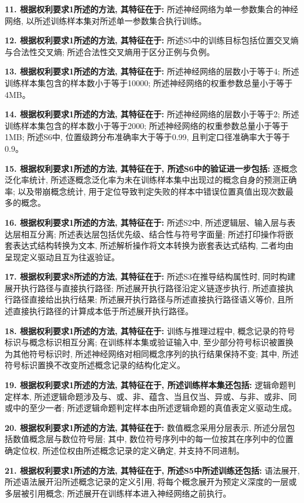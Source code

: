 \documentclass[
]{article}
\begin{document}
\textbf{11. 根据权利要求1所述的方法, 其特征在于:}
所述神经网络为单一参数集合的神经网络,
以所述训练样本集对所述单一参数集合执行训练。

\textbf{12. 根据权利要求1所述的方法, 其特征在于:}
所述S5中的训练目标包括位置交叉熵与合法性交叉熵;
所述合法性交叉熵用于区分正例与负例。

\textbf{13. 根据权利要求1所述的方法, 其特征在于:}
所述神经网络的层数小于等于4; 所述训练样本集包含的样本数小于等于10000;
所述神经网络的权重参数总量小于等于4MB。

\textbf{14. 根据权利要求1所述的方法, 其特征在于:}
所述神经网络的层数小于等于2; 所述训练样本集包含的样本数小于等于2000;
所述神经网络的权重参数总量小于等于1MB; 所述S6中,
位置级跨分布准确率大于等于0.99, 且判定口径准确率大于等于0.9。

\textbf{15. 根据权利要求1所述的方法, 其特征在于,
所述S6中的验证进一步包括:} 逐概念泛化率统计,
所述逐概念泛化率为未在训练样本集中出现过的概念自身的预测正确率;
以及带崩概念统计,
用于定位导致判定失败的样本中错误位置真值出现次数最多的概念。

\textbf{16. 根据权利要求1所述的方法, 其特征在于:} 所述S2中,
所述逻辑层、输入层与表达层相互分离;
所述表达层包括优先级、结合性与符号字面量;
所述打印操作将嵌套表达式结构转换为文本,
所述解析操作将文本转换为嵌套表达式结构,
二者均由呈现定义驱动且互为往返验证。

\textbf{17. 根据权利要求8所述的方法, 其特征在于:}
所述S3在推导结构属性时, 同时构建展开执行路径与直接执行路径;
所述展开执行路径沿定义链逐步执行, 所述直接执行路径直接给出执行结果;
所述展开执行路径与所述直接执行路径语义等价,
且所述直接执行路径的计算成本低于所述展开执行路径。

\textbf{18. 根据权利要求1所述的方法, 其特征在于:} 训练与推理过程中,
概念记录的符号标识与概念标识相互分离; 在训练样本集或验证输入中,
至少部分符号标识被置换为其他符号标识时,
所述神经网络对相同概念序列的执行结果保持不变; 其中,
所述符号标识置换不改变所述概念记录的结构化定义。

\textbf{19. 根据权利要求1所述的方法, 其特征在于, 所述训练样本集还包括:}
逻辑命题判定样本,
所述逻辑命题涉及与、或、非、蕴含、当且仅当、异或、与非、或非、同或中的至少一者;
所述逻辑命题判定样本由所述逻辑命题的真值表定义驱动生成。

\textbf{20. 根据权利要求1所述的方法, 其特征在于:} 数值概念采用分层表示,
所述分层包括数值概念层与数位符号层; 其中,
数位符号序列中的每一位按其在序列中的位置确定位权,
所述位权由所述概念记录的定义确定, 并支持不同进制。

\textbf{21. 根据权利要求1所述的方法, 其特征在于,
所述S5中所述训练还包括:} 语法展开, 所述语法展开沿所述概念记录的定义引用,
将每个概念展开为预定义深度的一层或多层被引用概念;
所述展开在训练样本进入神经网络之前执行。
\end{document}
